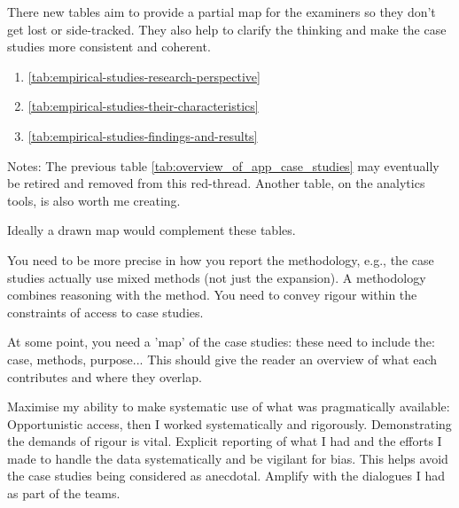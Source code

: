 
There new tables aim to provide a partial map for the examiners so they don't get lost or side-tracked. They also help to clarify the thinking and make the case studies more consistent and coherent.

\begin{enumerate}
    \item \ref{tab:empirical-studies-research-perspective} 
    \item \ref{tab:empirical-studies-their-characteristics} 
    \item \ref{tab:empirical-studies-findings-and-results} 
\end{enumerate}

Notes: The previous table \ref{tab:overview_of_app_case_studies}  may eventually be retired and removed from this red-thread. Another table, on the analytics tools, is also worth me creating.

Ideally a drawn map would complement these tables.


You need to be more precise in how you report the methodology, e.g., the case studies actually use mixed methods (not just the expansion). A methodology combines reasoning with the method. You need to convey rigour within the constraints of access to case studies.

At some point, you need a 'map' of the case studies:  these need to include the: case, methods, purpose...  This should give the reader an overview of what each contributes and where they overlap.


Maximise my ability to make systematic use of what was pragmatically available: Opportunistic access, then I worked systematically and rigorously. Demonstrating the demands of rigour is vital. Explicit reporting of what I had and the efforts I made to handle the data systematically and be vigilant for bias. This helps avoid the case studies being considered as anecdotal. Amplify with the dialogues I had as part of the teams.

